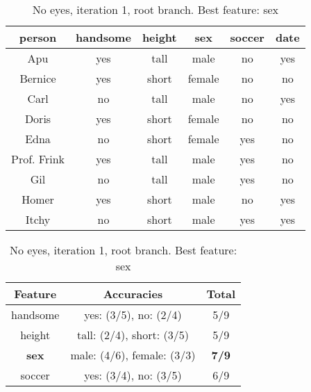 \begin{table}[h!]
  \centering
  \begin{tabular}{ccccc|c}
    \toprule
    person      & handsome & height & sex    & soccer & date\\
    \midrule
    Apu         & yes      & tall   & male   & no     & yes \\
    Bernice     & yes      & short  & female & no     & no  \\
    Carl        & no       & tall   & male   & no     & yes \\
    Doris       & yes      & short  & female & no     & no  \\
    Edna        & no       & short  & female & yes    & no  \\
    Prof. Frink & yes      & tall   & male   & yes    & no  \\
    Gil         & no       & tall   & male   & yes    & no  \\
    Homer       & yes      & short  & male   & no     & yes \\
    Itchy       & no       & short  & male   & yes    & yes \\
    \bottomrule
  \end{tabular}

  \vspace{.5cm}

  \begin{tabular}{ccc}
    \toprule
    Feature      & Accuracies                              & Total\\
    \midrule
    handsome     & yes: (3/5), no: (2/4)                   & 5/9\\
    height       & tall: (2/4), short: (3/5)               & 5/9\\
    \textbf{sex} & male: (4/6), female: (3/3)              & \textbf{7/9}\\
    soccer       & yes: (3/4), no: (3/5)                   & 6/9\\
    \bottomrule
  \end{tabular}
  \caption*{No eyes, iteration 1, root branch. Best feature: sex}
\end{table}

